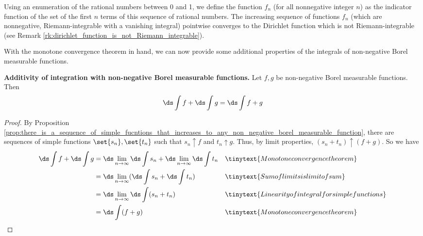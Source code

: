 \documentclass{article} %
\begin{document}
\begin{remark}{}
Using an enumeration of the rational numbers between 0 and 1, we define the function $f_n$ (for all nonnegative integer $n$) as the indicator function of the set of the first $n$ terms of this sequence of rational numbers. The increasing sequence of functions $f_n$ (which are nonnegative, Riemann-integrable with a vanishing integral) pointwise converges to the Dirichlet function which is not Riemann-integrable (see Remark \ref{rk:dirichlet_function_is_not_Riemann_integrable}).
\end{remark}


With the monotone convergence theorem in hand, we can now provide some additional properties of the integrals of non-negative Borel measurable functions.

\begin{proposition}{\textbf{Additivity of integration with non-negative Borel measurable functions.}}
Let $f, g$ be non-negative Borel measurable functions. Then
\[ \ds\int f + \ds\int g = \ds\int f+g \]
\label{prop:additivity_of_integral_for_non_negative_Borel_measurable_functions}
\end{proposition}

\begin{proof}
By Proposition \ref{prop:there_is_a_sequence_of_simple_fucntions_that_increases_to_any_non_negative_borel_measurable_function}, there are sequences of simple functions $\set{s_n}, \set{t_n}$ such that $s_n \uparrow f$ and $t_n \uparrow g$.   Thus, by limit properties, $(s_n + t_n) \uparrow (f+g)$.  So we have
\begin{align*}
	\ds\int f + \ds\int g &=\ds\lim_{n \to \infty} \ds\int s_n + \ds\lim_{n \to \infty} \ds\int t_n && \tinytext{Monotone convergence theorem} \\
	&= \ds\lim_{n \to \infty} ( \ds\int s_n +  \ds\int t_n ) && \tinytext{Sum of limits is limit of sum} \\
	&=  \ds\lim_{n \to \infty} \ds\int (s_n + t_n)  && \tinytext{Linearity of integral for simple functions}\\
	&= \ds\int (f+g)  && \tinytext{Monotone convergence theorem}
 \end{align*}
\end{proof}
\end{document}
